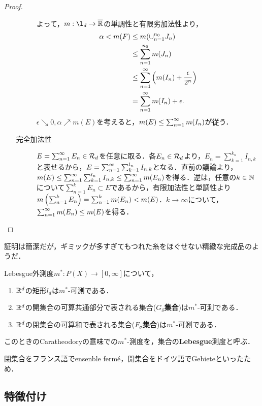 \documentclass[uplatex, dvipdfmx]{jsreport}
\begin{document}
\begin{proof}
\begin{enumerate}
\begin{description}
            よって，$m:\l_d\to\o{\R}$の単調性と有限劣加法性より，
            \begin{align*}
                \alpha<m(F)&\le m(\cup_{n=1}^{n_0}J_n)\\
                &\le\sum_{n=1}^{n_0}m(J_n)\\
                &\le\sum_{n=1}^\infty\left(m(I_n)+\frac{\epsilon}{2^n}\right)\\
                &=\sum_{n=1}^\infty m(I_n)+\epsilon.
            \end{align*}
            $\epsilon\searrow 0,\alpha\nearrow m(E)$を考えると，$m(E)\le\sum_{n=1}^\infty m(I_n)$が従う．
            \item[完全加法性]
            $E=\sum_{n=1}^\infty E_n\in\mathcal{R}_d$を任意に取る．各$E_n\in\mathcal{R}_d$より，$E_n=\sum_{k=1}^{k_n}I_{n,k}$と表せるから，$E=\sum_{n=1}^\infty\sum_{k=1}^{l_n}I_{n,k}$となる．直前の議論より，$m(E)\le\sum_{n=1}^\infty\sum_{k=1}^{l_n}I_{n,k}\le\sum_{n=1}^\infty m(E_n)$を得る．逆は，任意の$k\in\mathbb{N}$について$\sum^k_{n=1}E_n\subset E$であるから，有限加法性と単調性より$m\left(\sum_{n=1}^kE_n\right)=\sum_{n=1}^km(E_n)<m(E)$．$k\to\infty$について，$\sum_{n=1}^\infty m(E_n)\le m(E)$を得る．
        \end{description}
    \end{enumerate}
\end{proof}
\begin{remarks}
    証明は簡潔だが，ギミックが多すぎてもつれた糸をほぐせない精緻な完成品のようだ．
\end{remarks}

\begin{proposition}[Lebesgue可測集合の例]
    Lebesgue外測度$m^*:P(X)\to[0,\infty]$について，
    \begin{enumerate}
        \item $\mathbb{R}^d$の矩形$l_d$は$m^*$-可測である．
        \item $\mathbb{R}^d$の開集合の可算共通部分で表される集合(\textbf{$G_\delta$集合})は$m^*$-可測である．
        \item $\mathbb{R}^d$の閉集合の可算和で表される集合(\textbf{$F_\sigma$集合})は$m^*$-可測である．
    \end{enumerate}
    このときのCaratheodoryの意味での$m^*$-測度を，集合の\textbf{Lebesgue}測度と呼ぶ．
\end{proposition}
\begin{remark}
    閉集合をフランス語でensenble fermé，開集合をドイツ語でGebieteといったため．
\end{remark}

\subsection{特徴付け}
\end{document}
